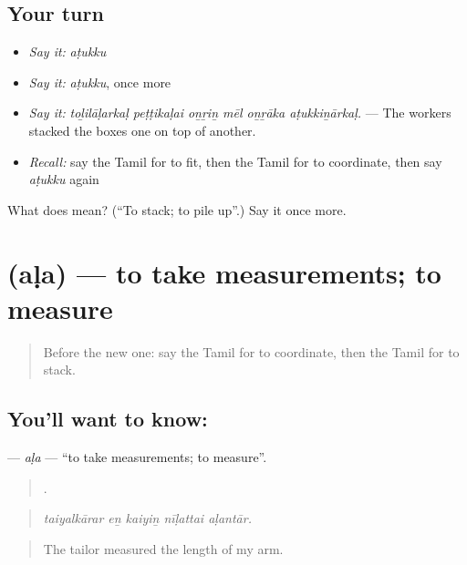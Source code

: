 \subsection*{Your turn}
\begin{itemize}
\raggedright
  \item \emph{Say it:} \emph{aṭukku}
  \item \emph{Say it:} \emph{aṭukku}, once more
  \item \emph{Say it:} \emph{toḻilāḷarkaḷ peṭṭikaḷai oṉṟiṉ mēl oṉṟāka aṭukkiṉārkaḷ.} — The workers stacked the boxes one on top of another.
  \item \emph{Recall:} say the Tamil for to fit, then the Tamil for to coordinate, then say \emph{aṭukku} again
\end{itemize}

\begin{tcolorbox}[breakable,colback=teal!4,colframe=teal!35!black,title={Before you move on}]
What does  mean? (\textquotedblleft{}To stack; to pile up\textquotedblright{}.) Say it once more.
\end{tcolorbox}
\section[\texorpdfstring{\ta{அள} (aḷa)}{அள (aḷa)}]{ (aḷa) — to take measurements; to measure}

\label{lesson:TA-C510-ala}



\begin{quote}
Before the new one: say the Tamil for to coordinate, then the Tamil for to stack.
\end{quote}

\subsection*{You'll want to know: }
\textbf{} — \emph{aḷa} — \textquotedblleft{}to take measurements; to measure\textquotedblright{}.

\begin{quote}
    .
\end{quote}

\begin{quote}
\emph{taiyalkārar eṉ kaiyiṉ nīḷattai aḷantār.}
\end{quote}

\begin{quote}
The tailor measured the length of my arm.
\end{quote}

